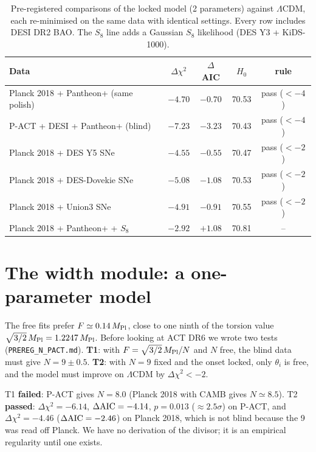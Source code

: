 \documentclass[11pt]{article}
\newcommand{\Mp}{M_{\rm Pl}}
\begin{document}
\begin{table}[h]
\centering
\small
\begin{tabular}{lcccc}
\toprule
Data & $\Delta\chi^2$ & $\Delta$AIC & $H_0$ & rule\\
\midrule
Planck 2018 + Pantheon+ (same polish) & $-4.70$ & $-0.70$ & 70.53 & pass ($<-4$)\\
P-ACT + DESI + Pantheon+ (blind) & $-7.23$ & $-3.23$ & 70.43 & pass ($<-4$)\\
Planck 2018 + DES Y5 SNe & $-4.55$ & $-0.55$ & 70.47 & pass ($<-2$)\\
Planck 2018 + DES-Dovekie SNe & $-5.08$ & $-1.08$ & 70.53 & pass ($<-2$)\\
Planck 2018 + Union3 SNe & $-4.91$ & $-0.91$ & 70.55 & pass ($<-2$)\\
Planck 2018 + Pantheon+ + $S_8$ & $-2.92$ & $+1.08$ & 70.81 & --\\
\bottomrule
\end{tabular}
\caption{Pre-registered comparisons of the locked model (2 parameters) against $\Lambda$CDM, each
re-minimised on the same data with identical settings. Every row includes DESI DR2 BAO. The $S_8$ line
adds a Gaussian $S_8$ likelihood (DES Y3 + KiDS-1000).}
\label{tab:prereg}
\end{table}

\section{The width module: a one-parameter model}\label{sec:width}
The free fits prefer $F\simeq0.14\,\Mp$, close to one ninth of the torsion value
$\sqrt{3/2}\,\Mp=1.2247\,\Mp$. Before looking at ACT DR6 we wrote two tests
(\texttt{PREREG\_N\_PACT.md}). \textbf{T1}: with $F=\sqrt{3/2}\,\Mp/N$ and $N$ free, the blind data
must give $N=9\pm0.5$. \textbf{T2}: with $N=9$ fixed and the onset locked, only $\theta_i$ is free,
and the model must improve on $\Lambda$CDM by $\Delta\chi^2<-2$.

T1 \textbf{failed}: P-ACT gives $N=8.0$ (Planck 2018 with CAMB gives $N\simeq8.5$). T2
\textbf{passed}: $\Delta\chi^2=-6.14$, $\Delta{\rm AIC}=-4.14$, $p=0.013$ ($\approx2.5\sigma$) on P-ACT, and
$\Delta\chi^2=-4.46$ ($\Delta{\rm AIC}=-2.46$) on Planck 2018, which is not blind because the 9 was read
off Planck. We have no derivation of the divisor; it is an empirical regularity until one exists.
\end{document}
